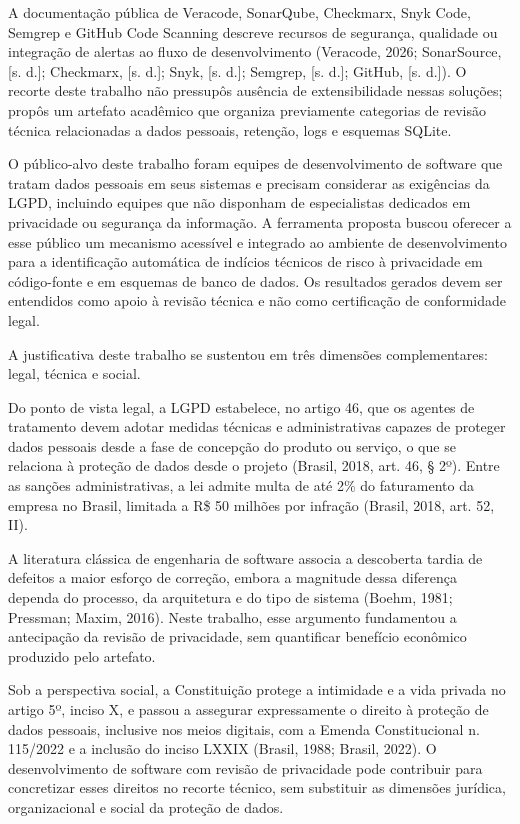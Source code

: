 \documentclass[12pt,a4paper,oneside]{report}
\begin{document}
A documentação pública de Veracode, SonarQube, Checkmarx, Snyk Code, Semgrep e GitHub Code Scanning descreve recursos de segurança, qualidade ou integração de alertas ao fluxo de desenvolvimento (Veracode, 2026; SonarSource, [s. d.]; Checkmarx, [s. d.]; Snyk, [s. d.]; Semgrep, [s. d.]; GitHub, [s. d.]). O recorte deste trabalho não pressupôs ausência de extensibilidade nessas soluções; propôs um artefato acadêmico que organiza previamente categorias de revisão técnica relacionadas a dados pessoais, retenção, logs e esquemas SQLite.

O público-alvo deste trabalho foram equipes de desenvolvimento de software que tratam dados pessoais em seus sistemas e precisam considerar as exigências da LGPD, incluindo equipes que não disponham de especialistas dedicados em privacidade ou segurança da informação. A ferramenta proposta buscou oferecer a esse público um mecanismo acessível e integrado ao ambiente de desenvolvimento para a identificação automática de indícios técnicos de risco à privacidade em código-fonte e em esquemas de banco de dados. Os resultados gerados devem ser entendidos como apoio à revisão técnica e não como certificação de conformidade legal.

A justificativa deste trabalho se sustentou em três dimensões complementares: legal, técnica e social.

Do ponto de vista legal, a LGPD estabelece, no artigo 46, que os agentes de tratamento devem adotar medidas técnicas e administrativas capazes de proteger dados pessoais desde a fase de concepção do produto ou serviço, o que se relaciona à proteção de dados desde o projeto (Brasil, 2018, art. 46, § 2º). Entre as sanções administrativas, a lei admite multa de até 2\% do faturamento da empresa no Brasil, limitada a R\$ 50 milhões por infração (Brasil, 2018, art. 52, II).

A literatura clássica de engenharia de software associa a descoberta tardia de defeitos a maior esforço de correção, embora a magnitude dessa diferença dependa do processo, da arquitetura e do tipo de sistema (Boehm, 1981; Pressman; Maxim, 2016). Neste trabalho, esse argumento fundamentou a antecipação da revisão de privacidade, sem quantificar benefício econômico produzido pelo artefato.

Sob a perspectiva social, a Constituição protege a intimidade e a vida privada no artigo 5º, inciso X, e passou a assegurar expressamente o direito à proteção de dados pessoais, inclusive nos meios digitais, com a Emenda Constitucional n. 115/2022 e a inclusão do inciso LXXIX (Brasil, 1988; Brasil, 2022). O desenvolvimento de software com revisão de privacidade pode contribuir para concretizar esses direitos no recorte técnico, sem substituir as dimensões jurídica, organizacional e social da proteção de dados.
\end{document}
